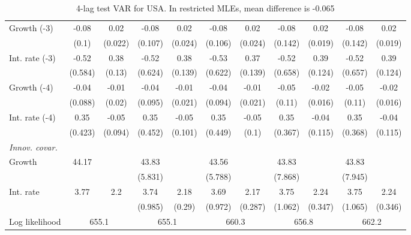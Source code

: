 \begin{table}[htbp]
\begin{tabular}{@{\extracolsep{4pt}}lcccccccccc@{}}
\quad Growth (-3) 	 &-0.08 	 & 0.02 	 & -0.08 	 & 0.02 	 & -0.08 	 & 0.02 	 & -0.08 	 & 0.02 	 & -0.08 	 & 0.02	 \\ 
 		 & (0.1) 	 & (0.022) 	 & (0.107) 	 & (0.024) 	 & (0.106) 	 & (0.024) 	 & (0.142) 	 & (0.019) 	 & (0.142) 	 & (0.019) 	 \\ 
\quad Int. rate (-3) 	 &-0.52 	 & 0.38 	 & -0.52 	 & 0.38 	 & -0.53 	 & 0.37 	 & -0.52 	 & 0.39 	 & -0.52 	 & 0.39	 \\ 
 		 & (0.584) 	 & (0.13) 	 & (0.624) 	 & (0.139) 	 & (0.622) 	 & (0.139) 	 & (0.658) 	 & (0.124) 	 & (0.657) 	 & (0.124) 	 \\ 
\quad Growth (-4) 	 &-0.04 	 & -0.01 	 & -0.04 	 & -0.01 	 & -0.04 	 & -0.01 	 & -0.05 	 & -0.02 	 & -0.05 	 & -0.02	 \\ 
 		 & (0.088) 	 & (0.02) 	 & (0.095) 	 & (0.021) 	 & (0.094) 	 & (0.021) 	 & (0.11) 	 & (0.016) 	 & (0.11) 	 & (0.016) 	 \\ 
\quad Int. rate (-4) 	 &0.35 	 & -0.05 	 & 0.35 	 & -0.05 	 & 0.35 	 & -0.05 	 & 0.35 	 & -0.04 	 & 0.35 	 & -0.04	 \\ 
 		 & (0.423) 	 & (0.094) 	 & (0.452) 	 & (0.101) 	 & (0.449) 	 & (0.1) 	 & (0.367) 	 & (0.115) 	 & (0.368) 	 & (0.115) 	 \\ 
\rule{0pt}{4ex} \emph{Innov. covar.}  	 & 	 & 	 & 	 & 	 & 	 & 	 & 	 & 	 & 	 &\\ 
\quad Growth 	 &44.17 	 &  	 & 43.83 	 &  	 & 43.56 	 &  	 & 43.83 	 &  	 & 43.83 	 & 	 \\ 
 		 &  	 &  	 & (5.831) 	 &  	 & (5.788) 	 &  	 & (7.868) 	 &  	 & (7.945) 	 &  	 \\ 
\quad Int. rate 	 &3.77 	 & 2.2 	 & 3.74 	 & 2.18 	 & 3.69 	 & 2.17 	 & 3.75 	 & 2.24 	 & 3.75 	 & 2.24	 \\ 
 		 &  	 &  	 & (0.985) 	 & (0.29) 	 & (0.972) 	 & (0.287) 	 & (1.062) 	 & (0.347) 	 & (1.065) 	 & (0.346) 	 \\ 
 \hline \rule{0pt}{4ex} 
  Log likelihood 	 &\multicolumn{2}{c}{655.1} 	 & \multicolumn{2}{c}{655.1} 	 & \multicolumn{2}{c}{660.3} 	 & \multicolumn{2}{c}{656.8} 	 & \multicolumn{2}{c}{662.2}\\ 

 \hline 	\end{tabular}		\caption{4-lag test VAR for USA. In restricted MLEs, mean difference is -0.065}
		\label{tab:USA4}

\end{table}